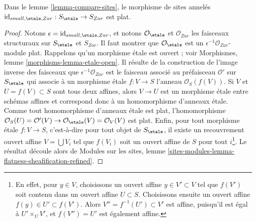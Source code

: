 \begin{lemma}
\label{lemma-compare-etale-zariski-flat}
Dans le lemme \ref{lemma-compare-sites}, le morphisme de sites annelés
$\text{id}_{small, \etale, Zar} : S_\etale \to S_{Zar}$ est plat.
\end{lemma}

\begin{proof}
Notons $\epsilon = \text{id}_{small, \etale, Zar}$, et notons
$\mathcal{O}_\etale$ et $\mathcal{O}_{Zar}$ les faisceaux structuraux sur
$S_\etale$ et $S_{Zar}$. Il faut montrer que $\mathcal{O}_\etale$ est un
$\epsilon^{-1}\mathcal{O}_{Zar}$-module plat. Rappelons qu'un morphisme
\'etale est ouvert ; voir Morphismes, lemme
\ref{morphisms-lemma-etale-open}. Il résulte de la construction de l'image
inverse des faisceaux que $\epsilon^{-1}\mathcal{O}_{Zar}$ est le faisceau
associé au préfaisceau $\mathcal{O}'$ sur $S_\etale$ qui associe à un
morphisme \'etale $f : V \to S$ l'anneau $\mathcal{O}_S(f(V))$. Si $V$ et
$U = f(V) \subset S$ sont tous deux affines, alors $V \to U$ est un
morphisme \'etale entre schémas affines et correspond donc à un homomorphisme
d'anneaux \'etale. Comme tout homomorphisme d'anneaux \'etale est plat,
l'homomorphisme
$\mathcal{O}_S(U) = \mathcal{O}'(V) \to
\mathcal{O}_\etale(V) = \mathcal{O}_V(V)$ est plat.
Enfin, pour tout morphisme \'etale $f : V \to S$, c'est-à-dire pour tout
objet de $S_\etale$, il existe un recouvrement ouvert affine
$V = \bigcup V_i$ tel que $f(V_i)$ soit un ouvert affine de $S$ pour tout
$i$\footnote{En effet, pour $y \in V$, choisissons un ouvert affine
$y \in V' \subset V$ tel que $f(V')$ soit contenu dans un ouvert affine
$U \subset S$. Choisissons ensuite un ouvert affine
$f(y) \in U' \subset f(V')$. Alors $V'' = f^{-1}(U') \subset V'$ est affine,
puisqu'il est égal à $U' \times_U V'$, et $f(V'') = U'$ est également affine.}.
Le résultat découle alors de Modules sur les sites, lemme
\ref{sites-modules-lemma-flatness-sheafification-refined}.
\end{proof}


